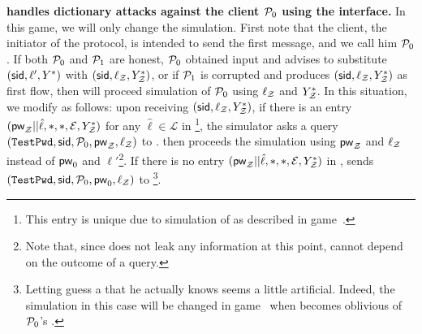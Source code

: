 \begin{games}
\textbf{\Sim handles dictionary attacks against the client $\mathcal{P}_{0}$ using the \TestPwd interface.}
In this game, we will only change the simulation. First note that the client, the initiator of the protocol, is intended to send the first message, and we call him $\mathcal{P}_{0}$. If both $\mathcal{P}_{0}$ and $\mathcal{P}_{1}$ are honest, $\mathcal{P}_{0}$ obtained input and \Env advises \AdvA to substitute $(\mathsf{sid},\ell',Y^*)$ with $(\mathsf{sid},\ell_\mathcal{Z},Y^*_\mathcal{Z})$, or if $\mathcal{P}_{1}$ is corrupted and produces $(\mathsf{sid},\ell_\mathcal{Z},Y^*_\mathcal{Z})$ as first flow, then \Sim will proceed simulation of $\mathcal{P}_{0}$ using $\ell_\mathcal{Z}$ and $Y^*_\mathcal{Z}$.
In this situation, we modify \Sim as follows:
upon receiving $(\mathsf{sid},\ell_\mathcal{Z},Y^*_\mathcal{Z})$, if there is an entry $(\mathsf{pw}_\mathcal{Z}||\hat\ell,*,*,\mathcal{E},Y^*_\mathcal{Z})$ for any $\hat\ell\in\mathcal{L}$ in \ListIC\footnote{This entry is unique due to simulation of \Fic as described in game~.}, the simulator asks a \TestPwd query $(\texttt{TestPwd},\mathsf{sid},\mathcal{P}_{0},\mathsf{pw}_\mathcal{Z},\ell_\mathcal{Z})$ to \Func. \Sim then proceeds the simulation using $\mathsf{pw}_\mathcal{Z}$ and $\ell_\mathcal{Z}$ instead of $\mathsf{pw}_{0}$ and $\ell'$\footnote{Note that, since \Func does not leak any information at this point, \Sim cannot depend on the outcome of a \TestPwd query.}. If there is no entry $(\mathsf{pw}_\mathcal{Z}||\hat\ell,*,*,\mathcal{E},Y^*_\mathcal{Z})$ in \ListIC, \Sim sends $(\texttt{TestPwd},\mathsf{sid},\mathcal{P}_{0},\mathsf{pw}_{0},\ell_\mathcal{Z})$ to \Func\footnote{Letting \Sim guess a \password that he actually knows seems a little artificial. Indeed, the simulation in this case will be changed in game~ when \Sim becomes oblivious of $\mathcal{P}_{0}$'s \password.}.

\end{games}
